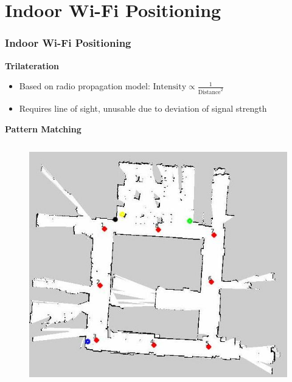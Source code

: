 \documentclass[noshadow]{LSRslides}
\begin{document}
\section{Indoor Wi-Fi Positioning}
\begin{frame}
\frametitle{Indoor Wi-Fi Positioning}

	\textbf{Trilateration}

   
   \begin{itemize}
	\item Based on radio propagation model: 
	$\text{Intensity} \propto \frac{1}{\text{Distance}^2}$
	\item Requires line of sight, unusable due to deviation of signal strength
\end{itemize}
\textbf{Pattern Matching}
\begin{columns}
\vspace*{-4mm}	
	\begin{figure}
      \includegraphics[scale=0.24,left]{DatabaseAndRouterPosNoTitleNEW.jpg} 
   \end{figure}
	
	
	

\end{columns}
\end{frame}
\end{document}
